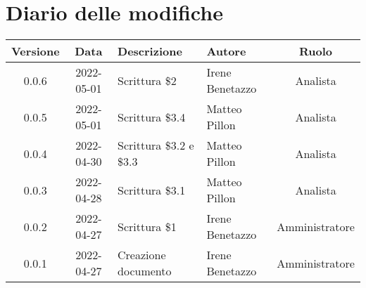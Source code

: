 \section*{Diario delle modifiche}
	\begin{center}
	\renewcommand{\arraystretch}{1.8} %
	\begin{tabular}{ |c|c|m{12em}|m{7em}|c| }
	\hline
	
	\textbf{Versione} & \textbf{Data} & \textbf{Descrizione} &  \textbf{Autore} &  \textbf{Ruolo} \\ %
	\hline
    0.0.6 & 2022-05-01 & Scrittura \$2 & Irene Benetazzo & Analista\\
	\hline
    0.0.5 & 2022-05-01 & Scrittura \$3.4 & Matteo Pillon & Analista \\ %
	\hline
    0.0.4 & 2022-04-30 & Scrittura \$3.2 e \$3.3 & Matteo Pillon & Analista \\ %
	\hline
    0.0.3 & 2022-04-28 & Scrittura \$3.1 & Matteo Pillon & Analista \\ %
	\hline
    0.0.2 & 2022-04-27 & Scrittura \$1 & Irene Benetazzo & Amministratore\\ %
	\hline
    0.0.1 & 2022-04-27 & Creazione documento & Irene Benetazzo & Amministratore\\
	\hline
	\end{tabular}
	\end{center}
	\newpage